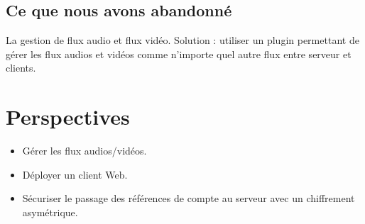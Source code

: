 \documentclass[11pt,dvipsnames,svgnames]{report}
\begin{document}
\subsection{Ce que nous avons abandonné}
La gestion de flux audio et flux vidéo.
Solution : utiliser un plugin permettant de gérer les flux audios et vidéos comme n'importe quel autre flux entre serveur et clients.
\section{Perspectives}
\begin{itemize}
\item Gérer les flux audios/vidéos.
\item Déployer un client Web.
\item Sécuriser le passage des références de compte au serveur avec un chiffrement asymétrique.
\end{itemize}
\end{document}
